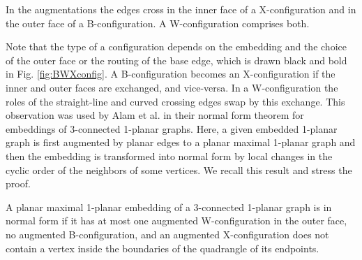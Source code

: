 \documentclass[runningheads]{llncs}
\begin{document}
In the augmentations the edges cross in the inner face of a
X-configuration and in the outer face of a B-configuration. A
W-configuration comprises both.

\iffalse

 A B-configuration consists of a base edge (on the left) and
the end vertices of the crossed edges are inside the triangle of the
base edge and the half-edges to the crossing point.  In an
X-crossing the end vertices are in the exterior. A W-configuration
comprises a B- and an X-configuration. Recall that we consider
planar maximal graphs, where each crossing induces a  for the
endpoints of each pair of crossing edges, and these edges are added
in the \emph{augmentation}  if they were missing. Then the crossing
point is in the exterior in a B-configuration and in the interior in
a X-configuration. See also \cite{t-rdg-88} and \cite{abk-sld3c-13}.

\fi


 Note that the type of a configuration depends on the
embedding and the choice of the outer face or the routing of the
 base edge, which is drawn black and bold in Fig.
\ref{fig:BWXconfig}. A B-configuration becomes an X-configuration if
the inner and outer faces are exchanged, and vice-versa. In a
W-configuration the roles of the straight-line and curved crossing
edges swap by this exchange.
 This observation was used by Alam et al. \cite{abk-sld3c-13} in
their normal form theorem for embeddings of 3-connected 1-planar
graphs. Here, a given embedded 1-planar graph is first augmented by
planar edges to a planar maximal 1-planar graph and then the
embedding is transformed into normal form by local changes in the
cyclic order of the neighbors of some vertices. We recall this
result and stress the proof.

\begin{definition}
A planar maximal 1-planar embedding  of a
3-connected 1-planar graph is in \textrm{normal form} if it has at
most one augmented W-configuration in the outer face, no augmented
B-configuration, and an augmented X-configuration does not contain a
vertex inside   the boundaries of the quadrangle of its endpoints.
\end{definition}
\end{document}
